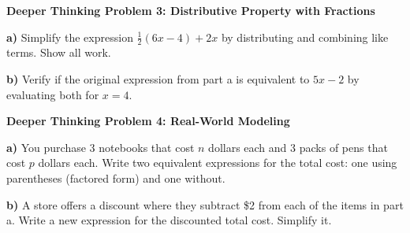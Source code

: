 \documentclass[12pt, letterpaper, fleqn]{article}
\begin{document}
\begin{tcolorbox}[colback=white, colframe=black, boxrule=1pt, arc=4mm, left=6mm, right=6mm, top=5mm, bottom=5mm]
\textbf{Deeper Thinking Problem 3: Distributive Property with Fractions}

\medskip

\noindent
\textbf{a)} Simplify the expression $\frac{1}{2}(6x - 4) + 2x$ by distributing and combining like terms. Show all work.

\vspace{2.5cm}

\noindent
\textbf{b)} Verify if the original expression from part a is equivalent to $5x - 2$ by evaluating both for $x = 4$.

\vspace{3cm}
\end{tcolorbox}
\vspace{0.5cm}

\begin{tcolorbox}[colback=white, colframe=black, boxrule=1pt, arc=4mm, left=6mm, right=6mm, top=5mm, bottom=5mm]
\textbf{Deeper Thinking Problem 4: Real-World Modeling}


\noindent
\textbf{a)} You purchase 3 notebooks that cost $n$ dollars each and 3 packs of pens that cost $p$ dollars each. Write two equivalent expressions for the total cost: one using parentheses (factored form) and one without.

\vspace{2.5cm}

\noindent
\textbf{b)} A store offers a discount where they subtract \$2 from each of the items in part a. Write a new expression for the discounted total cost. Simplify it.

\vspace{3cm}
\end{tcolorbox}
\end{document}
